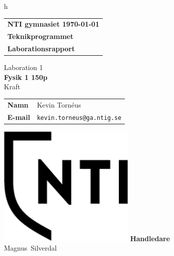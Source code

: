 h\documentclass[11p, titlepage, oneside, a4paper]{article}
\makeatletter
\def\inst{Teknikprogrammet}
\def\typeofdoc{Laborationsrapport}
\def\course{Fysik 1 150p}
\def\pretitle{Laboration 1}
\def\title{Kraft}
\def\name{Kevin Tornéus}
\def\username{kevin.torneus}
\def\email{\username{}@ga.ntig.se}
\def\graders{Magnus Silverdal}
\makeatother
\begin{document}
\begin{titlepage}
		\thispagestyle{empty}
		\begin{large}
			\begin{tabular}{@{}p{\textwidth}@{}}
				\textbf{NTI gymnasiet \hfill \today} \\
				\textbf{\inst} \\
				\textbf{\typeofdoc} \\
			\end{tabular}
		\end{large}
		\vspace{10mm}
		\begin{center}
			\LARGE{\pretitle} \\
			\huge{\textbf{\course}}\\
			\vspace{10mm}
			\LARGE{\title} \\
			\vspace{15mm}
			\begin{large}
				\begin{tabular}{ll}
					\textbf{Namn} & \name \\
					\textbf{E-mail} & \texttt{\email} \\
				\end{tabular}
			\end{large}
			\vfill
            \includegraphics[width=0.5\textwidth]{images/NTI Gymnasiet_Symbol_print_svart.png}
			\vfill
            \large{\textbf{Handledare}}\\
			\mbox{\large{\graders}}
		\end{center}
	\end{titlepage}

    \begin{otherlanguage}{english}

    \end{otherlanguage}
	\tableofcontents
	
\end{document}
